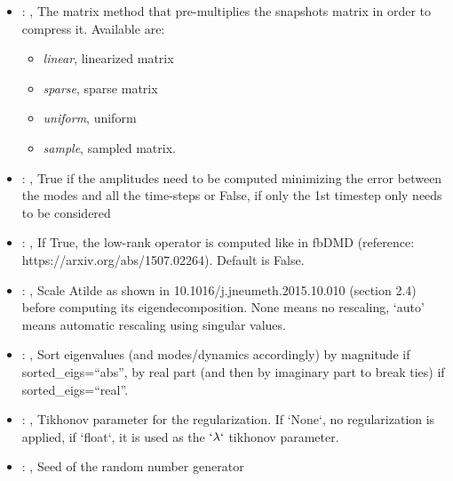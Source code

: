\begin{itemize}
    \item {}: , 
      The matrix method that pre-multiplies the snapshots matrix in order to compress it. Available
      are:                                                   \begin{itemize}
      \item \textit{linear}, linearized matrix
      \item \textit{sparse}, sparse matrix                                                     \item
      \textit{uniform}, uniform                                                     \item
      \textit{sample}, sampled matrix.
      \end{itemize}

    \item {}: , 
      True if the amplitudes need to be computed minimizing the error
      between the modes and all the time-steps or False, if only the 1st timestep only needs to be
      considered

    \item {}: , 
      If True, the low-rank operator is computed like in fbDMD (reference:
      https://arxiv.org/abs/1507.02264).                                                  Default is
      False.

    \item {}: , 
      Scale Atilde as shown in 10.1016/j.jneumeth.2015.10.010 (section 2.4) before computing its
      eigendecomposition. None means no rescaling, ‘auto’ means automatic rescaling using singular
      values.

    \item {}: , 
      Sort eigenvalues (and modes/dynamics accordingly) by magnitude if sorted\_eigs=``abs'',
      by real part (and then by imaginary part to break ties) if sorted\_eigs=``real''.

    \item {}: , 
      Tikhonov parameter for the regularization.                                                  If
      `None`, no regularization is applied, if `float`, it is used as the
      $`\lambda`$ tikhonov parameter.

    \item {}: , 
      Seed of the random number generator
  \end{itemize}


